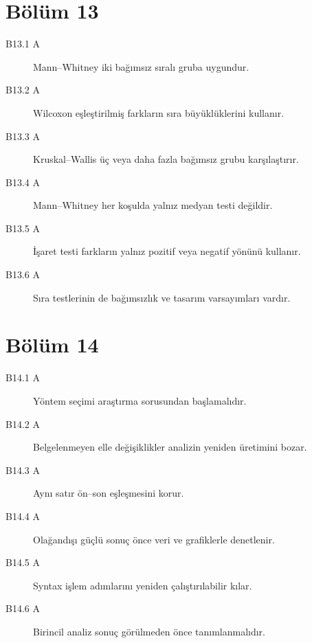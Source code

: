 \section*{Bölüm 13}
\begin{description}
\item[B13.1 A] Mann--Whitney iki bağımsız sıralı gruba uygundur.
\item[B13.2 A] Wilcoxon eşleştirilmiş farkların sıra büyüklüklerini kullanır.
\item[B13.3 A] Kruskal--Wallis üç veya daha fazla bağımsız grubu karşılaştırır.
\item[B13.4 A] Mann--Whitney her koşulda yalnız medyan testi değildir.
\item[B13.5 A] İşaret testi farkların yalnız pozitif veya negatif yönünü kullanır.
\item[B13.6 A] Sıra testlerinin de bağımsızlık ve tasarım varsayımları vardır.
\end{description}

\section*{Bölüm 14}
\begin{description}
\item[B14.1 A] Yöntem seçimi araştırma sorusundan başlamalıdır.
\item[B14.2 A] Belgelenmeyen elle değişiklikler analizin yeniden üretimini bozar.
\item[B14.3 A] Aynı satır ön--son eşleşmesini korur.
\item[B14.4 A] Olağandışı güçlü sonuç önce veri ve grafiklerle denetlenir.
\item[B14.5 A] Syntax işlem adımlarını yeniden çalıştırılabilir kılar.
\item[B14.6 A] Birincil analiz sonuç görülmeden önce tanımlanmalıdır.
\end{description}